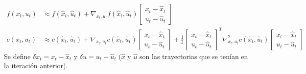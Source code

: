 \begin{align}
    f ( x _ { t } , u _ { t } ) &\approx f ( \hat { x } _ { t } , \hat { u } _ { t } ) + \nabla _
    { x _ { t } , u _ { t } } f ( \hat { x } _ { t } , \hat { u } _ { t } ) \left[ \begin{array}
    { c } { x _ { t } - \hat { x } _ { t } } \\ { u _ { t } - \hat { u } _ { t } } \end{array}
\right]\\
c(x_t,u_t)&\approx c ( \hat { x } _ { t } , \hat { u } _ { t } ) + \nabla _ { x _ { t } , u _ { t } } c ( \hat { x } _ { t } , \hat { u } _ { t } ) \left[ \begin{array} { c } { x _ { t } - \hat { x } _ { t } } \\ { u _ { t } - \hat { u } _ { t } } \end{array} \right] + \frac { 1 } { 2 } \left[ \begin{array} { c } { x _ { t } - \hat { x } _ { t } } \\ { u _ { t } - \hat { u } _ { t } } \end{array} \right] ^ { T } \nabla _ { x _ { t } , u _ { t } } ^ { 2 } c ( \hat { x } _ { t } , \hat { u } _ { t } ) \left[ \begin{array} { c } { x _ { t } - \hat { x } _ { t } } \\ { u _ { t } - \hat { u } _ { t } } \end{array} \right]
\end{align}
Se define $\delta x_t=x_t-\hat{x}_t$ y $\delta u=u_t-\hat{u}_t$ ($\hat{x}$ y $\hat{u}$ son las
trayectorias que se tenían en la iteración anterior).
